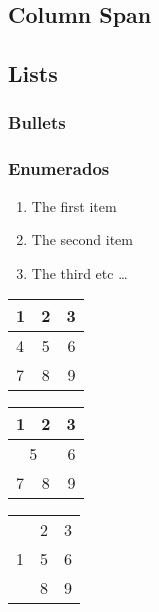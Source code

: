\documentclass[12pt]{article}  %
\begin{document}
\subsection{Column Span} 


\subsection{Lists}

\subsubsection{Bullets}


\subsubsection{Enumerados}

\begin{enumerate}
  \item The first item
  \item The second item
  \item The third etc \ldots
\end{enumerate}

\begin{tabular}{|  l  | c | r | }
  \hline                       
  1 & 2 & 3 \\ \hline
  4 & 5 & 6 \\ \hline
  7 & 8 & 9 \\
  \hline  
\end{tabular}

\begin{tabular}{|  l  | c | r | }
  \hline                       
  1 & 2 & 3 \\ \hline
  \multicolumn{2}{|c|}{ 5 } & 6 \\ \hline
  7 & 8 & 9 \\ 
  \hline  
\end{tabular}

\begin{tabular}{|  l  | c | r | }
  \hline      
  \multirow{3}{*}{1} & 2 & 3 \\ \cline{2-3}
   & 5 & 6 \\ \cline{2-3}
   & 8 & 9 \\
  \hline  
\end{tabular}
\end{document}
